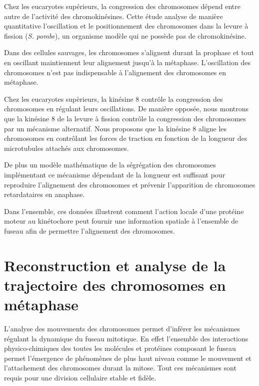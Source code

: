 \documentclass[12pt,a4paper,twoside,openright]{book}
\begin{document}
Chez les eucaryotes supérieurs, la congression des chromosomes dépend
entre autre de l'activité des chromokinésines. Cette étude analyse de
manière quantitative l'oscillation et le positionnement des chromosomes
dans la levure à fission (\emph{S. pombe}), un organisme modèle qui ne
possède pas de chromokinésine.

Dans des cellules sauvages, les chromosomes s'alignent durant la
prophase et tout en oscillant maintiennent leur alignement jusqu'à la
métaphase. L'oscillation des chromosomes n'est pas indispensable à
l'alignement des chromosomes en métaphase.

Chez les eucaryotes supèrieurs, la kinésine 8 contrôle la congression
des chromosomes en régulant leurs oscillations. De manière opposée, nous
montrons que la kinésine 8 de la levure à fission contrôle la
congression des chromosomes par un mécanisme alternatif. Nous proposons
que la kinésine 8 aligne les chromosomes en contrôlant les forces de
traction en fonction de la longueur des microtubules attachés aux
chromosomes.

De plus un modèle mathématique de la ségrégation des chromosomes
implémentant ce mécanisme dépendant de la longueur est suffisant pour
reproduire l'alignement des chromosomes et prévenir l'apparition de
chromosomes retardataires en anaphase.

Dans l'ensemble, ces données illustrent comment l'action locale d'une
protéine moteur au kinétochore peut fournir une information spatiale à
l'ensemble de fuseau afin de permettre l'alignement des chromosomes.





\section{Reconstruction et analyse de la trajectoire des chromosomes en
métaphase}\label{reconstruction-et-analyse-de-la-trajectoire-des-chromosomes-en-muxe9taphase}

L'analyse des mouvements des chromosomes permet d'inférer les mécanismes
régulant la dynamique du fuseau mitotique. En effet l'ensemble des
interactions physico-chimiques des toutes les molécules et protéines
composant le fuseau permet l'émergence de phénomènes de plus haut niveau
comme le mouvement et l'attachement des chromosomes durant la mitose.
Tout ces mécanismes sont requis pour une division cellulaire stable et
fidèle.
\end{document}

